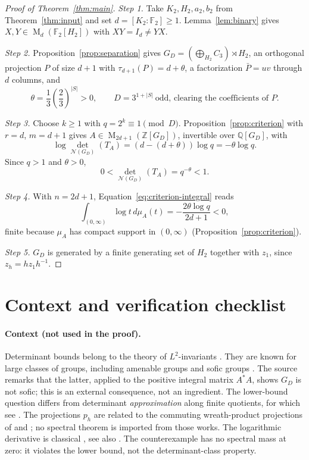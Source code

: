 \documentclass[11pt]{article}
\theoremstyle{remark}
\numberwithin{equation}{section}
\newcommand{\F}{\mathbb F}
\newcommand{\Z}{\mathbb Z}
\newcommand{\Q}{\mathbb Q}
\newcommand{\Mat}{\operatorname{M}}
\newcommand{\N}{\mathcal N}
\begin{document}
\begin{proof}[Proof of Theorem~\ref{thm:main}]
\emph{Step 1.} Take $K_2,H_2,a_2,b_2$ from Theorem~\ref{thm:input} and set $d=[K_2:\F_2]\ge1$. Lemma~\ref{lem:binary} gives $X,Y\in\Mat_d(\F_2[H_2])$ with $XY=I_d\ne YX$.

\emph{Step 2.} Proposition~\ref{prop:separation} gives $G_D=(\bigoplus_{H_2}C_3)\rtimes H_2$, an orthogonal projection $P$ of size $d+1$ with $\tau_{d+1}(P)=d+\theta$, a factorization $\bar P=uv$ through $d$ columns, and
\[
 \theta=\frac13\left(\frac23\right)^{|S|}>0,
 \qquad D=3^{1+|S|}\ \text{odd, clearing the coefficients of }P.
\]

\emph{Step 3.} Choose $k\ge1$ with $q=2^k\equiv1\pmod D$. Proposition~\ref{prop:criterion} with $r=d$, $m=d+1$ gives $A\in\Mat_{2d+1}(\Z[G_D])$, invertible over $\Q[G_D]$, with
\[
 \log\det_{\N(G_D)}(T_A)=(d-(d+\theta))\log q=-\theta\log q.
\]
Since $q>1$ and $\theta>0$,
\begin{equation}\label{eq:final-det}
 0<\det_{\N(G_D)}(T_A)=q^{-\theta}<1.
\end{equation}

\emph{Step 4.} With $n=2d+1$, Equation~\eqref{eq:criterion-integral} reads
\begin{equation}\label{eq:final-integral}
 \int_{(0,\infty)}\log t\,d\mu_A(t)
 =-\frac{2\theta\log q}{2d+1}<0,
\end{equation}
finite because $\mu_A$ has compact support in $(0,\infty)$ (Proposition~\ref{prop:criterion}).

\emph{Step 5.} $G_D$ is generated by a finite generating set of $H_2$ together with $z_1$, since $z_h=hz_1h^{-1}$.
\end{proof}

\section{Context and verification checklist}

\paragraph{Context (not used in the proof).} Determinant bounds belong to the theory of $L^2$-invariants \cite{Luck2002}. They are known for large classes of groups, including amenable groups \cite[Theorem 1.21, with its erratum]{Schick2001} and sofic groups \cite[Theorem 5]{ElekSzabo2005}. The source remarks that the latter, applied to the positive integral matrix $A^*A$, shows $G_D$ is not sofic; this is an external consequence, not an ingredient. The lower-bound question differs from determinant \emph{approximation} along finite quotients, for which see \cite[Theorem 2 and Section 2]{Kammeyer2026}. The projections $p_h$ are related to the commuting wreath-product projections of \cite[Section 3]{DicksSchick2002} and \cite[Section 2]{LehnerNeuhauserWoess2008}; no spectral theorem is imported from those works. The logarithmic derivative is classical \cite[Lemma 2]{FK1952}, see also \cite[Lemma 1 and Proposition 2(d)]{deLaHarpeSkandalis1984}. The counterexample has no spectral mass at zero: it violates the lower bound, not the determinant-class property.
\end{document}
